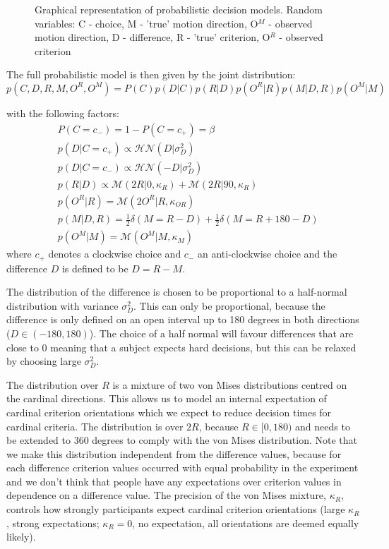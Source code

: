 \documentclass[10pt,a4paper]{article}
\begin{document}
\begin{figure}
    \centering
    \def\svgwidth{.5\columnwidth}
    
    \caption{Graphical representation of probabilistic decision models. Random variables: C - choice, M - 'true' motion direction, O$^M$ - observed motion direction, D - difference, R - 'true' criterion, O$^R$ - observed criterion}
    \label{fig:graphic_models}
\end{figure}

The full probabilistic model is then given by the joint distribution:
\begin{equation}\label{eq:joint_diff}
p(C, D, R, M, O^R, O^M) = P(C)p(D | C)p(R | D)p(O^R | R)p(M | D, R)p(O^M | M)
\end{equation}

with the following factors:
\begin{align}
&P(C = c_-) = 1 - P(C = c_+) = \beta\\
&p(D | C=c_+) \propto \mathcal{HN}(D | \sigma_D^2)\\
&p(D | C=c_-) \propto \mathcal{HN}(-D | \sigma_D^2)\\
&p(R | D) \propto \mathcal{M}(2R | 0, \kappa_{R}) + \mathcal{M}(2R | 90, \kappa_{R})\\
&p(O^R | R) = \mathcal{M}(2O^R | R, \kappa_{OR})\\
&p(M | D, R) = \frac{1}{2}\delta(M = R - D) + \frac{1}{2}\delta(M = R + 180 - D)\\
&p(O^M | M) = \mathcal{M}(O^M | M, \kappa_{M})
\end{align}
where $c_+$ denotes a clockwise choice and $c_-$ an anti-clockwise choice and the difference $D$ is defined to be $D = R - M$. 

The distribution of the difference is chosen to be proportional to a half-normal distribution with variance $\sigma_D^2$. This can only be proportional, because the difference is only defined on an open interval up to 180 degrees in both directions ($D \in (-180, 180)$). The choice of a half normal will favour differences that are close to 0 meaning that a subject expects hard decisions, but this can be relaxed by choosing large $\sigma_D^2$. 

The distribution over $R$ is a mixture of two von Mises distributions centred on the cardinal directions. This allows us to model an internal expectation of cardinal criterion orientations which we expect to reduce decision times for cardinal criteria. The distribution is over $2R$, because $R \in [0, 180)$ and needs to be extended to 360 degrees to comply with the von Mises distribution. Note that we make this distribution independent from the difference values, because for each difference criterion values occurred with equal probability in the experiment and we don't think that people have any expectations over criterion values in dependence on a difference value. The precision of the von Mises mixture, $\kappa_R$, controls how strongly participants expect cardinal criterion orientations (large $\kappa_R$, strong expectations; $\kappa_R=0$, no expectation, all orientations are deemed equally likely).
\end{document}
